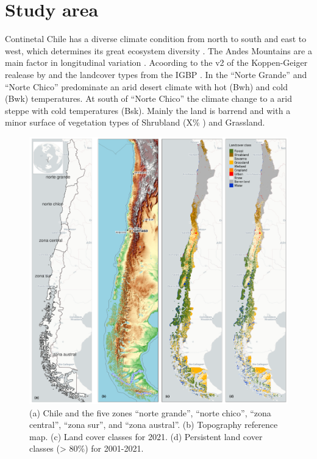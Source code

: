 \documentclass[
  number,
  preprint,
  3p]{elsarticle}
\begin{document}
\hypertarget{study-area}{%
\section{Study area}\label{study-area}}

Continetal Chile has a diverse climate condition from north to south and
east to west, which determines its great ecosystem diversity
\citep{Aceituno2021}. The Andes Mountains are a main factor in
longitudinal variation \citep{Garreaud2009}. Acoording to the v2 of the
Koppen-Geiger realease by \citep{Beck2023} and the landcover types from
the IGBP \citep{Friedl2019}. In the ``Norte Grande'' and ``Norte Chico''
predominate an arid desert climate with hot (Bwh) and cold (Bwk)
temperatures. At south of ``Norte Chico'' the climate change to a arid
steppe with cold temperatures (Bsk). Mainly the land is barrend and with
a minor surface of vegetation types of Shrubland (X\% ) and Grassland.

\begin{figure}[!ht]

{\centering \includegraphics{../output/figs/map_study_con_landcover.png}

}

\caption{(a) Chile and the five zones ``norte grande'', ``norte chico'',
``zona central'', ``zona sur'', and ``zona austral''. (b) Topography
reference map. (c) Land cover classes for 2021. (d) Persistent land
cover classes (\textgreater{} 80\%) for 2001-2021.}

\end{figure}
\end{document}
